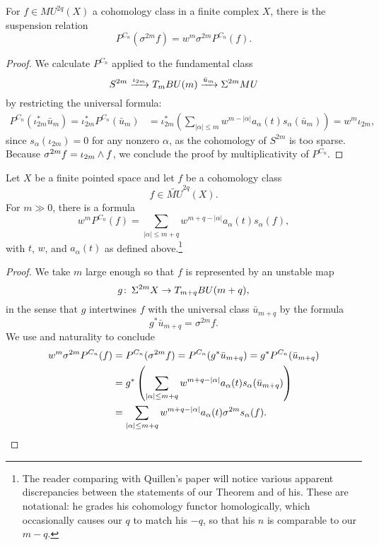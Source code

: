 \begin{lemma}\label{PowerOpnsOnSuspensions}
For \(f \in MU^{2q}(X)\) a cohomology class in a finite complex \(X\), there is the suspension relation \[P^{C_n}(\sigma^{2m} f) = w^m \sigma^{2m} P^{C_n}(f).\]
\end{lemma}
\begin{proof}
We calculate \(P^{C_n}\) applied to the fundamental class \[S^{2m} \xrightarrow{\iota_{2m}} T_m BU(m) \xrightarrow{\bar u_m} \Sigma^{2m} MU\] by restricting the universal formula:
\begin{align*}
P^{C_n}(\iota_{2m}^* \bar u_m) = \iota_{2m}^* P^{C_n}(\bar u_m) & = \iota_{2m}^* \left( \sum_{|\alpha| \le m} w^{m - |\alpha|} a_\alpha(t) s_\alpha(\bar u_m) \right) = w^m \iota_{2m},
\end{align*}
since \(s_\alpha(\iota_{2m}) = 0\) for any nonzero \(\alpha\), as the cohomology of \(S^{2m}\) is too sparse.  Because \(\sigma^{2m} f = \iota_{2m} \wedge f\), we conclude the proof by multiplicativity of \(P^{C_n}\).
\end{proof}

\begin{theorem}\label{QuillensKeyRelation}
Let \(X\) be a finite pointed space and let \(f\) be a cohomology class \[f \in \widetilde{MU}^{2q}(X).\]  For \(m \gg 0\), there is a formula \[w^m P^{C_n}(f) = \sum_{|\alpha| \le m+q} w^{m+q - |\alpha|} a_\alpha(t) s_\alpha(f),\] with \(t\), \(w\), and \(a_\alpha(t)\) as defined above.\footnote{The reader comparing with Quillen's paper will notice various apparent discrepancies between the statements of our Theorem and of his.  These are notational: he grades his cohomology functor homologically, which occasionally causes our \(q\) to match his \(-q\), so that his \(n\) is comparable to our \(m-q\).}
\end{theorem}
\begin{proof}
We take \(m\) large enough so that \(f\) is represented by an unstable map \[g\colon\thinspace \Sigma^{2m} X \to T_{m+q} BU(m+q),\] in the sense that \(g\) intertwines \(f\) with the universal class \(\bar u_{m+q}\) by the formula \[g^* \bar u_{m+q} = \sigma^{2m} f.\]  We use  and naturality to conclude
\begin{align*}
w^m \sigma^{2m} P^{C_n}(f) & = P^{C_n}(\sigma^{2m} f) = P^{C_n}(g^* \bar u_{m+q}) = g^* P^{C_n}(\bar u_{m+q}) \\
& = g^* \left(\sum_{|\alpha| \le m+q} w^{m+q - |\alpha|} a_\alpha(t) s_\alpha(\bar u_{m+q}) \right) \\
& = \sum_{|\alpha| \le m+q} w^{m+q - |\alpha|} a_\alpha(t) \sigma^{2m} s_\alpha(f). \qedhere
\end{align*}
\end{proof}

